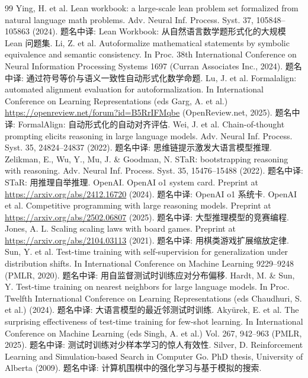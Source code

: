 \begin{thebibliography}{99}
 Ying, H. et al. Lean workbook: a large-scale lean problem set formalized from natural language math problems. Adv. Neural Inf. Process. Syst. 37, 105848--105863 (2024). 题名中译: Lean Workbook: 从自然语言数学题形式化的大规模 Lean 问题集.
 Li, Z. et al. Autoformalize mathematical statements by symbolic equivalence and semantic consistency. In Proc. 38th International Conference on Neural Information Processing Systems 1697 (Curran Associates Inc., 2024). 题名中译: 通过符号等价与语义一致性自动形式化数学命题.
 Lu, J. et al. Formalalign: automated alignment evaluation for autoformalization. In International Conference on Learning Representations (eds Garg, A. et al.) \url{https://openreview.net/forum?id=B5RrIFMqbe} (OpenReview.net, 2025). 题名中译: FormalAlign: 自动形式化的自动对齐评估.
 Wei, J. et al. Chain-of-thought prompting elicits reasoning in large language models. Adv. Neural Inf. Process. Syst. 35, 24824--24837 (2022). 题名中译: 思维链提示激发大语言模型推理.
 Zelikman, E., Wu, Y., Mu, J. \& Goodman, N. STaR: bootstrapping reasoning with reasoning. Adv. Neural Inf. Process. Syst. 35, 15476--15488 (2022). 题名中译: STaR: 用推理自举推理.
 OpenAI. OpenAI o1 system card. Preprint at \url{https://arxiv.org/abs/2412.16720} (2024). 题名中译: OpenAI o1 系统卡.
 OpenAI et al. Competitive programming with large reasoning models. Preprint at \url{https://arxiv.org/abs/2502.06807} (2025). 题名中译: 大型推理模型的竞赛编程.
 Jones, A. L. Scaling scaling laws with board games. Preprint at \url{https://arxiv.org/abs/2104.03113} (2021). 题名中译: 用棋类游戏扩展缩放定律.
 Sun, Y. et al. Test-time training with self-supervision for generalization under distribution shifts. In International Conference on Machine Learning 9229--9248 (PMLR, 2020). 题名中译: 用自监督测试时训练应对分布偏移.
 Hardt, M. \& Sun, Y. Test-time training on nearest neighbors for large language models. In Proc. Twelfth International Conference on Learning Representations (eds Chaudhuri, S. et al.) (2024). 题名中译: 大语言模型的最近邻测试时训练.
 Akyürek, E. et al. The surprising effectiveness of test-time training for few-shot learning. In International Conference on Machine Learning (eds Singh, A. et al.) Vol. 267, 942--963 (PMLR, 2025). 题名中译: 测试时训练对少样本学习的惊人有效性.
 Silver, D. Reinforcement Learning and Simulation-based Search in Computer Go. PhD thesis, University of Alberta (2009). 题名中译: 计算机围棋中的强化学习与基于模拟的搜索.

\end{thebibliography}
